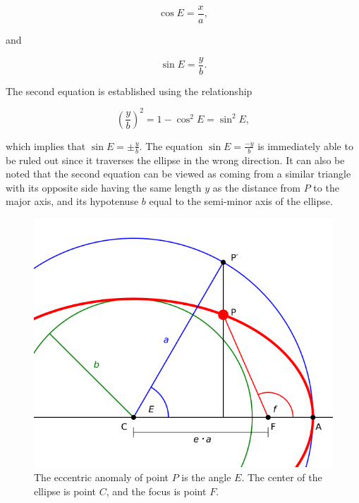 \documentclass[fleqn,usenatbib]{mnras}
\begin{document}
\begin{equation}
  \cos{E} = \frac{x}{a},
\end{equation}

and

\begin{equation}
  \sin{E} = \frac{y}{b}.
\end{equation}

The second equation is established using the relationship

\begin{equation}
  \left( \frac{y}{b} \right)^2 = 1 - \cos^2{E} = \sin^2{E},
\end{equation}

which implies that $ \sin{E} = \pm \frac{y}{b} $. The equation
$ \sin{E} = \frac{-y}{b} $ is immediately able to be ruled out since it
traverses the ellipse in the wrong direction. It can also be noted that
the second equation can be viewed as coming from a similar triangle with
its opposite side having the same length $y$ as the distance from $P$ to the
major axis, and its hypotenuse $b$ equal to the semi-minor axis of the ellipse.

\begin{figure}
\includegraphics[width=\columnwidth]{assignment}
\caption{The eccentric anomaly of point $P$ is the angle $E$.
The center of the ellipse is point $C$, and the focus is point $F$.}
\label{fig:eccentric_anomaly}
\end{figure}
\end{document}
